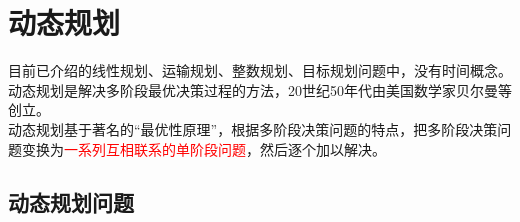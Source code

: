 \ifx\allfiles\undefined

	
	
\else
\fi
    \chapter{动态规划}
    目前已介绍的线性规划、运输规划、整数规划、目标规划问题中，没有时间概念。\\
    动态规划是解决多阶段最优决策过程的方法，20世纪50年代由美国数学家贝尔曼等创立。\\
    动态规划基于著名的“最优性原理”，根据多阶段决策问题的特点，把多阶段决策问题变换为\textcolor{red}{一系列互相联系的单阶段问题}，然后逐个加以解决。\\
    \section{动态规划问题}

